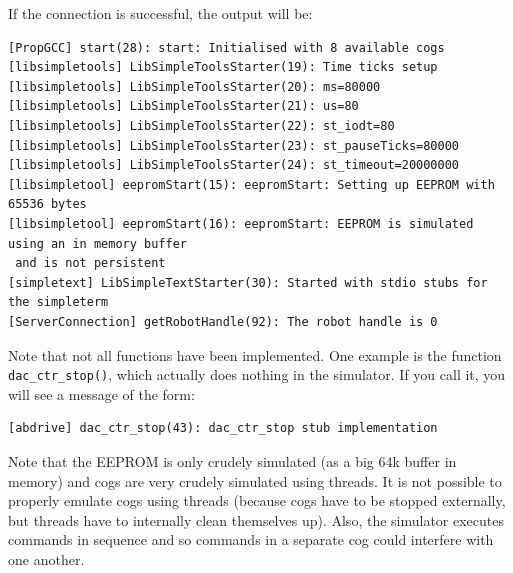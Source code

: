 \documentclass[a4paper]{article}
\begin{document}
If the connection is successful, the output will be:

\begin{verbatim}
[PropGCC] start(28): start: Initialised with 8 available cogs
[libsimpletools] LibSimpleToolsStarter(19): Time ticks setup
[libsimpletools] LibSimpleToolsStarter(20): ms=80000
[libsimpletools] LibSimpleToolsStarter(21): us=80
[libsimpletools] LibSimpleToolsStarter(22): st_iodt=80
[libsimpletools] LibSimpleToolsStarter(23): st_pauseTicks=80000
[libsimpletools] LibSimpleToolsStarter(24): st_timeout=20000000
[libsimpletool] eepromStart(15): eepromStart: Setting up EEPROM with 65536 bytes
[libsimpletool] eepromStart(16): eepromStart: EEPROM is simulated using an in memory buffer
 and is not persistent
[simpletext] LibSimpleTextStarter(30): Started with stdio stubs for the simpleterm
[ServerConnection] getRobotHandle(92): The robot handle is 0
\end{verbatim}

Note that not all functions have been implemented. One example is the function \verb+dac_ctr_stop()+, which actually does nothing in the simulator. If you call it, you will see a message of the form:

\begin{verbatim}
[abdrive] dac_ctr_stop(43): dac_ctr_stop stub implementation
\end{verbatim}

Note that the EEPROM is only crudely simulated (as a big 64k buffer in memory) and cogs are very crudely simulated using threads. It is not possible to properly emulate cogs using threads (because cogs have to be stopped externally, but threads have to internally clean themselves up). Also, the simulator executes commands in sequence and so commands in a separate cog could interfere with one another.
\end{document}

